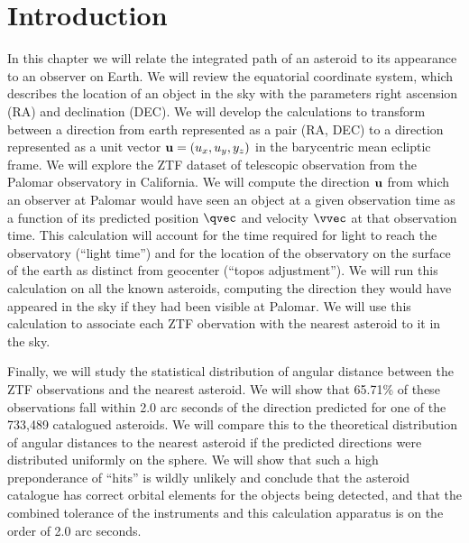 \section{Introduction}
\label{section_intro}
In this chapter we will relate the integrated path of an asteroid to its appearance to an observer on Earth.
We will review the equatorial coordinate system, which describes the location of an object in the sky 
with the parameters right ascension (RA) and declination (DEC).
We will develop the calculations to transform between a direction from earth represented as a pair (RA, DEC)
to a direction represented as a unit vector $\mathbf{u} = (u_x, u_y, y_z)$ in the barycentric mean ecliptic frame.
We will explore the ZTF dataset of telescopic observation from the Palomar observatory in California.
We will compute the direction $\mathbf{u}$ from which an observer at Palomar would have seen an object at a given observation time
as a function of its predicted position $\qvec$ and velocity $\vvec$ at that observation time.
This calculation will account for the time required for light to reach the observatory (``light time'')
and for the location of the observatory on the surface of the earth as distinct from geocenter (``topos adjustment'').
We will run this calculation on all the known asteroids, computing the direction they would have appeared in the sky if they had been visible at Palomar.
We will use this calculation to associate each ZTF obervation with the nearest asteroid to it in the sky.

Finally, we will study the statistical distribution of angular distance between the ZTF observations and the nearest asteroid.
We will show that 65.71\% of these observations fall within 2.0 arc seconds of the direction predicted for one of the 733,489 catalogued asteroids.
We will compare this to the theoretical distribution of angular distances to the nearest asteroid 
if the predicted directions were distributed uniformly on the sphere.
We will show that such a high preponderance of ``hits'' is wildly unlikely and conclude that the asteroid catalogue 
has correct orbital elements for the objects being detected, 
and that the combined tolerance of the instruments and this calculation apparatus is on the order of 2.0 arc seconds.

